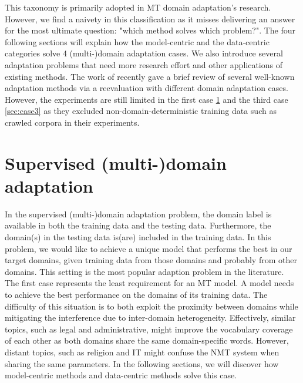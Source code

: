 This taxonomy is primarily adopted in MT domain adaptation's research. However, we find a naivety in this classification as it misses delivering an answer for the most ultimate question: "which method solves which problem?". The four following sections will explain how the model-centric and the data-centric categories solve 4 (multi-)domain adaptation cases. We also introduce several adaptation problems that need more research effort and other applications of existing methods. The work of \citet{Pham21revisiting} recently gave a brief review of several well-known adaptation methods via a reevaluation with different domain adaptation cases. However, the experiments are still limited in the first case \ref{sec:case1} and the third case \ref{sec:case3} as they excluded non-domain-deterministic training data such as crawled corpora in their experiments.

\section{Supervised (multi-)domain adaptation}
\label{sec:case1}
In the supervised (multi-)domain adaptation problem, the domain label is available in both the training data and the testing data. Furthermore, the domain(s) in the testing data is(are) included in the training data. In this problem, we would like to achieve a unique model that performs the best in our target domains, given training data from those domains and probably from other domains. This setting is the most popular adaption problem in the literature. The first case represents the least requirement for an MT model. A model needs to achieve the best performance on the domains of its training data. The difficulty of this situation is to both exploit the proximity between domains while mitigating the interference due to inter-domain heterogeneity. Effectively, similar topics, such as legal and administrative, might improve the vocabulary coverage of each other as both domains share the same domain-specific words. However, distant topics, such as religion and IT might confuse the NMT system when sharing the same parameters. In the following sections, we will discover how model-centric methods and data-centric methods solve this case.
